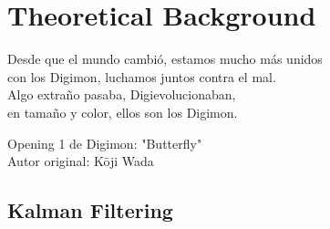 % 
% 
% 
% 
% 
% 
% 

\chapter{Theoretical Background}
\label{cha:theoretical_background}

\begin{FraseCelebre}
	\begin{Frase}
		Desde que el mundo cambió, estamos mucho más unidos \\
		con los Digimon, luchamos juntos contra el mal. \\ 

		Algo extraño pasaba, Digievolucionaban, \\
		en tamaño y color, ellos son los Digimon. \\
	\end{Frase}
	\begin{Fuente}
		Opening 1 de Digimon: "Butterfly" \\
		Autor original: Kōji Wada
	\end{Fuente}
\end{FraseCelebre}

\section{Kalman Filtering}
\label{sec:3_kf}


